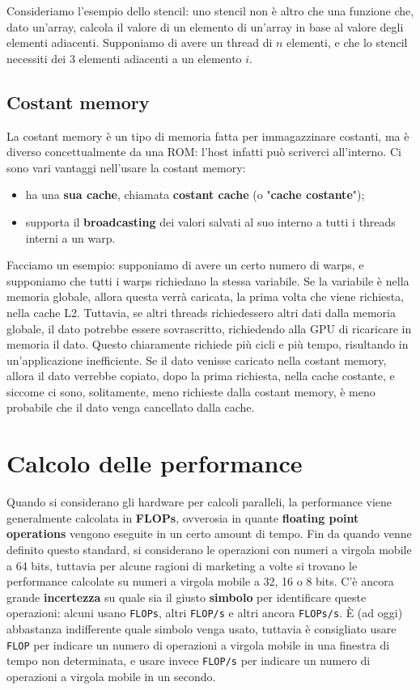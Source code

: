 Consideriamo l'esempio dello stencil: uno stencil non è altro che una funzione che, dato un'array, calcola il valore di un elemento di un'array in base al valore degli elementi adiacenti. Supponiamo di avere un thread di $n$ elementi, e che lo stencil necessiti dei 3 elementi adiacenti a un elemento $i$. 
\nl

\subsection{Costant memory}

La costant memory è un tipo di memoria fatta per immagazzinare costanti, ma è diverso concettualmente da una ROM: l'host infatti può scriverci all'interno. Ci sono vari vantaggi nell'usare la costant memory:
\begin{itemize}
    \item ha una \textbf{sua cache}, chiamata \textbf{costant cache} (o "\textbf{cache costante}");
    \item supporta il \textbf{broadcasting} dei valori salvati al suo interno a tutti i threads interni a un warp.
\end{itemize}

Facciamo un esempio: supponiamo di avere un certo numero di warps, e supponiamo che tutti i warps richiedano la stessa variabile. Se la variabile è nella memoria globale, allora questa verrà caricata, la prima volta che viene richiesta, nella cache L2. Tuttavia, se altri threads richiedessero altri dati dalla memoria globale, il dato potrebbe essere sovrascritto, richiedendo alla GPU di ricaricare in memoria il dato. Questo chiaramente richiede più cicli e più tempo, risultando in un'applicazione inefficiente.
\nl
Se il dato venisse caricato nella costant memory, allora il dato verrebbe copiato, dopo la prima richiesta, nella cache costante, e siccome ci sono, solitamente, meno richieste dalla costant memory, è meno probabile che il dato venga cancellato dalla cache.

\section{Calcolo delle performance}

Quando si considerano gli hardware per calcoli paralleli, la performance viene generalmente calcolata in \textbf{FLOPs}, ovverosia in quante \textbf{floating point operations} vengono eseguite in un certo amount di tempo. Fin da quando venne definito questo standard, si considerano le operazioni con numeri a virgola mobile a 64 bits, tuttavia per alcune ragioni di marketing a volte si trovano le performance calcolate su numeri a virgola mobile a 32, 16 o 8 bits.
\nl
C'è ancora grande \textbf{incertezza} su quale sia il giusto \textbf{simbolo} per identificare queste operazioni: alcuni usano \verb|FLOPs|, altri \verb|FLOP/s| e altri ancora \verb|FLOPs/s|. È (ad oggi) abbastanza indifferente quale simbolo venga usato, tuttavia è consigliato usare \verb|FLOP| per indicare un numero di operazioni a virgola mobile in una finestra di tempo non determinata, e usare invece \verb|FLOP/s| per indicare un numero di operazioni a virgola mobile in un secondo.
\nl
